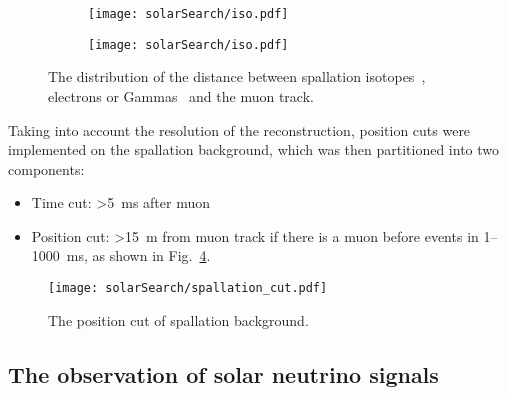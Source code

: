 \begin{figure}[htbp]
	\centering
	\begin{subfigure}{0.5\textwidth}
		\centering
		\texttt{[image: solarSearch/iso.pdf]}
		\caption{}
		\label{fig:solar_isotops}
	\end{subfigure}%
	\begin{subfigure}{0.5\textwidth}
		\centering
		\texttt{[image: solarSearch/iso.pdf]}
		\caption{}
		\label{fig:solar_gamma_electron}
	\end{subfigure}
	\caption{The distribution of the distance between spallation isotopes~,  electrons  or Gammas~ and the muon track.}
	\label{fig:solar_isotops}
\end{figure}
Taking into account the resolution of the reconstruction, position cuts were implemented on the spallation background, which was then partitioned into two components:
\begin{itemize}
	\item Time cut: >\SI{5}{ms} after muon
	\item Position cut: >\SI{15}{m} from muon track if there is a muon before events in 1--\SI{1000}{ms}, as shown in Fig.~\ref{fig:solar_spallation_cut}.
\end{itemize}

\begin{figure}[htbp]
	\centering
	\texttt{[image: solarSearch/spallation\_cut.pdf]}
	\caption{The position cut of spallation background.}
	\label{fig:solar_spallation_cut}
\end{figure}

\subsection{The observation of solar neutrino signals}
